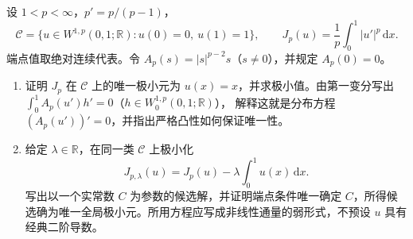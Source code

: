\begin{exercise}\label{b2:ex:14-p-laplace-interval}
设 \(1<p<\infty\)，\(p'=p/(p-1)\)，
\[
 \mathcal C=\{u\in W^{1,p}(0,1;\mathbb R):u(0)=0,\ u(1)=1\},
 \qquad J_p(u)=\frac1p\int_0^1|u'|^p\,\mathrm{d}x.
\]
端点值取绝对连续代表。令 \(A_p(s)=|s|^{p-2}s\)（\(s\ne0\)），并规定 \(A_p(0)=0\)。
\begin{enumerate}
\item\label{b2:item:14-p-interval-unforced}证明 \(J_p\) 在 \(\mathcal C\) 上的唯一极小元为 \(u(x)=x\)，并求极小值。由第一变分写出
\(\int_0^1 A_p(u')h'=0\)（\(h\in W_0^{1,p}(0,1;\mathbb R)\)），
解释这就是分布方程 \((A_p(u'))'=0\)，并指出严格凸性如何保证唯一性。
\item\label{b2:item:14-p-interval-forced}给定 \(\lambda\in\mathbb R\)，在同一类 \(\mathcal C\) 上极小化
\[
 J_{p,\lambda}(u)=J_p(u)-\lambda\int_0^1u(x)\,\mathrm{d}x.
\]
写出以一个实常数 \(C\) 为参数的候选解，并证明端点条件唯一确定 \(C\)，所得候选确为唯一全局极小元。所用方程应写成非线性通量的弱形式，不预设 \(u\) 具有经典二阶导数。
\end{enumerate}
\end{exercise}
